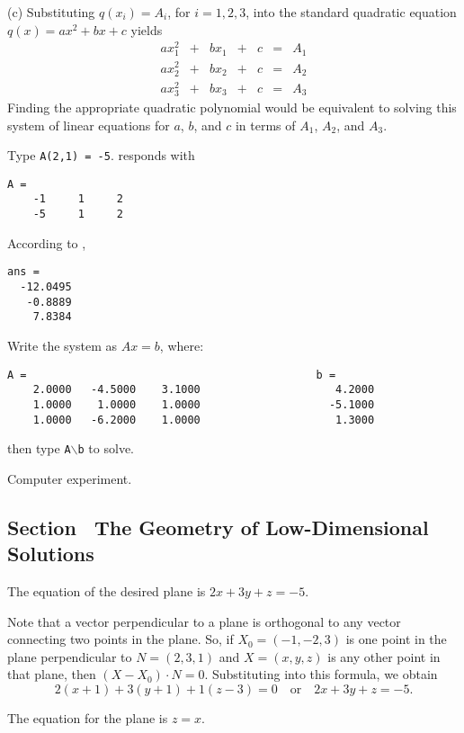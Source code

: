 (c) Substituting $q(x_i) = A_i$, for $i = 1,2,3$, into the standard
quadratic equation $q(x) = ax^2 + bx + c$ yields
\[
\begin{array}{ccccccc}
ax_1^2 & + & bx_1 & + & c & = & A_1 \\
ax_2^2 & + & bx_2 & + & c & = & A_2 \\
ax_3^2 & + & bx_3 & + & c & = & A_3\end{array}
\]
Finding the appropriate quadratic polynomial would be equivalent to
solving this system of linear equations for $a$, $b$, and $c$ in
terms of $A_1$, $A_2$, and $A_3$.

 Type {\tt A(2,1) = -5}.  \Matlab responds with
\begin{verbatim}
A =
    -1     1     2
    -5     1     2
\end{verbatim}

 \ans According to \Matlabp,
\begin{verbatim}
ans =
  -12.0495
   -0.8889
    7.8384
\end{verbatim}
\soln Write the system as $Ax = b$, where:
\begin{verbatim}
A =                                             b = 
    2.0000   -4.5000    3.1000                     4.2000
    1.0000    1.0000    1.0000                    -5.1000
    1.0000   -6.2000    1.0000                     1.3000
\end{verbatim}
then type {\tt A}$\backslash${\tt b} to solve.

 Computer experiment.



\subsection*{Section~\protect{\ref{S:2.2}} The Geometry of Low-Dimensional
Solutions}

\ans The equation of the desired plane is $2x + 3y + z = -5$.

\soln Note that a vector perpendicular to a plane is orthogonal
to any vector connecting two points in the plane.  So,
if $X_0 = (-1,-2,3)$ is one point in the plane perpendicular to
$N = (2,3,1)$ and $X = (x,y,z)$ is any other point in that plane,
then $(X - X_0) \cdot N = 0$.  Substituting into this formula, we obtain
\[
2(x + 1) + 3(y + 1) + 1(z - 3) = 0\quad\mbox{or}\quad
2x + 3y + z = -5.
\]

\ans The equation for the plane is $z = x$.

